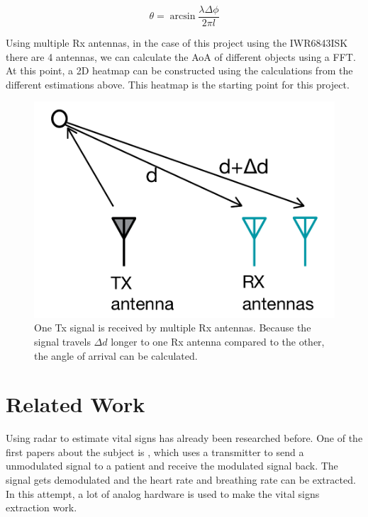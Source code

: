 \begin{equation}
\theta = \arcsin{\frac{\lambda \Delta \phi}{2 \pi l}}
\label{eq:angle_equation_2}
\end{equation}

Using multiple Rx antennas, in the case of this project using the IWR6843ISK there are 4 antennas, we can calculate the AoA of different objects using a FFT. At this point, a 2D heatmap can be constructed using the calculations from the different estimations above. This heatmap is the starting point for this project.

\begin{figure}[t]
\centering
\includegraphics[width=.5\textwidth]{figures/angle_estimation.png}
\caption{One Tx signal is received by multiple Rx antennas. Because the signal travels $\Delta d$ longer to one Rx antenna compared to the other, the angle of arrival can be calculated.}
\label{fig:angle_estimation}
\end{figure}

\section{Related Work}
\label{sec:related_work}
Using radar to estimate vital signs has already been researched before. One of the first papers about the subject is \cite{li2009radar}, which uses a transmitter to send a unmodulated signal to a patient and receive the modulated signal back. The signal gets demodulated and the heart rate and breathing rate can be extracted. In this attempt, a lot of analog hardware is used to make the vital signs extraction work. 

